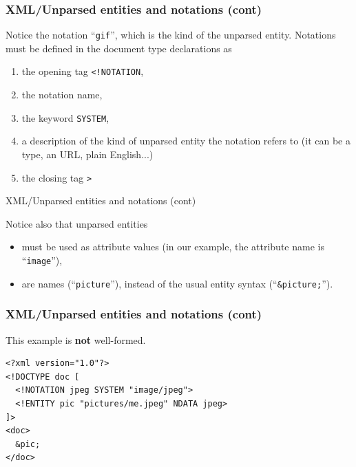 %
\begin{frame}[containsverbatim]
\frametitle{XML/Unparsed entities and notations (cont)}

Notice the notation ``\texttt{gif}'', which is the kind of the
unparsed entity. Notations must be defined in the document type
declarations as
\begin{enumerate}

  \item the opening tag \verb|<!NOTATION|,

  \item the notation name,

  \item the keyword \verb|SYSTEM|,

  \item a description of the kind of unparsed entity the notation
    refers to (it can be a \MIME type, an URL, plain English...)

  \item the closing tag \verb|>|

\end{enumerate}

\end{frame}

%
\begin{frame}{XML/Unparsed entities and notations (cont)}

Notice also that unparsed entities
\begin{itemize}

  \item must be used as attribute values (in our example, the
    attribute name is ``\texttt{image}''),

  \item are names (``\texttt{picture}''), instead of the usual entity
    syntax (``\texttt{\&picture;}'').

\end{itemize}

\end{frame}

%
\begin{frame}[containsverbatim]
\frametitle{XML/Unparsed entities and notations (cont)}

This example is \textbf{not} well-formed.
\begin{verbatim}
<?xml version="1.0"?>
<!DOCTYPE doc [
  <!NOTATION jpeg SYSTEM "image/jpeg">
  <!ENTITY pic "pictures/me.jpeg" NDATA jpeg>
]>
<doc>
  &pic;
</doc>
\end{verbatim}

\end{frame}

